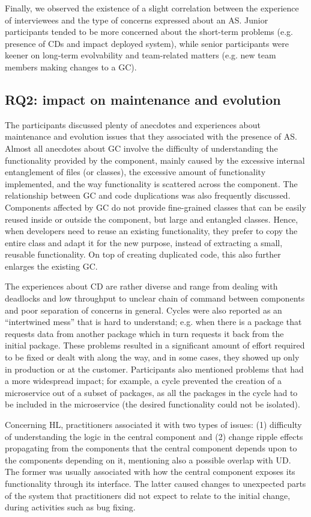 Finally, we observed the existence of a slight correlation between the experience of interviewees and the type of concerns expressed about an AS. Junior participants tended to be more concerned about the short-term problems (e.g. presence of CDs and impact deployed system), while senior participants were keener on long-term evolvability and team-related matters (e.g. new team members making changes to a GC).

\subsection{RQ2: impact on maintenance and evolution}
The participants discussed plenty of anecdotes and experiences about maintenance and evolution issues that they associated with the presence of AS. Almost all anecdotes about GC involve the difficulty of understanding the functionality provided by the component, mainly caused by the excessive internal entanglement of files (or classes), the excessive amount of functionality implemented, and the way functionality is scattered across the component. The relationship between GC and code duplications was also frequently discussed. Components affected by GC do not provide fine-grained classes that can be easily reused inside or outside the component, but large and entangled classes. Hence, when developers need to reuse an existing functionality, they prefer to copy the entire class and adapt it for the new purpose, instead of extracting a small, reusable functionality. On top of creating duplicated code, this also further enlarges the existing GC.

The experiences about CD are rather diverse and range from dealing with deadlocks and low throughput to unclear chain of command between components and poor separation of concerns in general. Cycles were also reported as an “intertwined mess” that is hard to understand; e.g. when there is a package that requests data from another package which in turn requests it back from the initial package. These problems resulted in a significant amount of effort required to be fixed or dealt with along the way, and in some cases, they showed up only in production or at the customer. Participants also mentioned problems that had a more widespread impact; for example, a cycle prevented the creation of a microservice out of a subset of packages, as all the packages in the cycle had to be included in the microservice (the desired functionality could not be isolated).

Concerning HL, practitioners associated it with two types of issues: (1) difficulty of understanding the logic in the central component and (2) change ripple effects propagating from the components that the central component depends upon to the components depending on it, mentioning also a possible overlap with UD. The former was usually associated with how the central component exposes its functionality through its interface. The latter caused changes to unexpected parts of the system that practitioners did not expect to relate to the initial change, during activities such as bug fixing.

